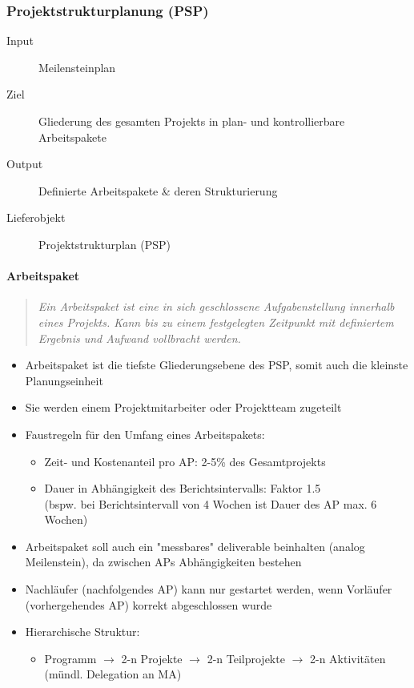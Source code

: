 \documentclass[a4paper]{article}
\begin{document}
	
\newpage
		
		\subsubsection{Projektstrukturplanung (PSP)}
		
		\begin{description}
			\item[Input] Meilensteinplan
			\item[Ziel] Gliederung des gesamten Projekts in plan- und kontrollierbare Arbeitspakete
			\item[Output] Definierte Arbeitspakete \& deren Strukturierung
			\item[Lieferobjekt] Projektstrukturplan (PSP)
		\end{description}
	
			\paragraph{Arbeitspaket}
			
				\begin{quote}
					\textit{Ein Arbeitspaket ist eine in sich geschlossene Aufgabenstellung innerhalb eines Projekts.
					Kann bis zu einem festgelegten Zeitpunkt mit definiertem Ergebnis und Aufwand vollbracht werden.}
				\end{quote}
			
			\begin{itemize}
				\item Arbeitspaket ist die tiefste Gliederungsebene des PSP, somit auch die kleinste Planungseinheit
				\item Sie werden einem Projektmitarbeiter oder Projektteam zugeteilt
				\item Faustregeln für den Umfang eines Arbeitspakets:
					\begin{itemize}
						\item Zeit- und Kostenanteil pro AP: 2-5\% des Gesamtprojekts
						\item Dauer in Abhängigkeit des Berichtsintervalls: Faktor 1.5\\
						(bspw. bei Berichtsintervall von 4 Wochen ist Dauer des AP max. 6 Wochen)					
					\end{itemize}
				\item Arbeitspaket soll auch ein "messbares" deliverable beinhalten (analog Meilenstein), da zwischen APs Abhängigkeiten bestehen
				\item Nachläufer (nachfolgendes AP) kann nur gestartet werden, wenn Vorläufer (vorhergehendes AP) korrekt abgeschlossen wurde
				\item Hierarchische Struktur:
					\begin{itemize}
						\item Programm $\rightarrow$ 2-n Projekte $\rightarrow$ 2-n Teilprojekte $\rightarrow$ 2-n Aktivitäten (mündl. Delegation an MA)
					\end{itemize}
			\end{itemize}
		
\end{document}

